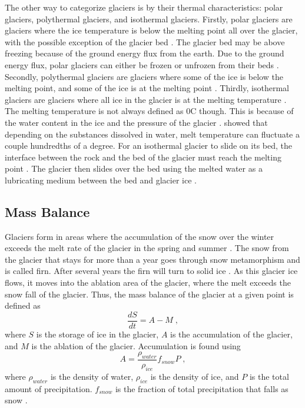 \documentclass{article}
\begin{document}
The other way to categorize glaciers is by their thermal characteristics: polar glaciers, polythermal glaciers, and isothermal glaciers. Firstly, polar glaciers are glaciers where the ice temperature is below the melting point all over the glacier, with the possible exception of the glacier bed \citep{Hooke2013}. The glacier bed may be above freezing because of the ground energy flux from the earth. Due to the ground energy flux, polar glaciers can either be frozen or unfrozen from their beds \citep{Hooke2013}. Secondly, polythermal glaciers are glaciers where some of the ice is below the melting point, and some of the ice is at the melting point \citep{Hooke2013}. Thirdly, isothermal glaciers are glaciers where all ice in the glacier is at the melting temperature \citep{Hooke2013}. The melting temperature is not always defined as 0C though. This is because of the water content in the ice and the pressure of the glacier \citep{Lliboutry1976}. \citet{Lliboutry1976} showed that depending on the substances dissolved in water, melt temperature can fluctuate a couple hundredths of a degree. For an isothermal glacier to slide on its bed, the interface between the rock and the bed of the glacier must reach the melting point \citep{Lliboutry1976}. The glacier then slides over the bed using the melted water as a lubricating medium between the bed and glacier ice \citep{Fowler1979}. 

\subsection{Mass Balance}
Glaciers form in areas where the accumulation of the snow over the winter exceeds the melt rate of the glacier in the spring and summer \citep{Hooke2013}. The snow from the glacier that stays for more than a year goes through snow metamorphism and is called firn. After several years the firn will turn to solid ice \citep{Hooke2013}. As this glacier ice flows, it moves into the ablation area of the glacier, where the melt exceeds the snow fall of the glacier. Thus, the mass balance of the glacier at a given point is defined as 
\begin{equation}
    \frac{dS}{dt} = A - M \; ,
\end{equation}
where $S$ is the storage of ice in the glacier, $A$ is the accumulation of the glacier, and $M$ is the ablation of the glacier. Accumulation is found using 
\begin{equation}\label{Accumulation}
A = \frac{\rho_{water}}{\rho_{ice}}f_{snow}P \; ,
\end{equation}
where $\rho_{water}$ is the density of water, $\rho_{ice}$ is the density of ice, and $P$ is the total amount of precipitation. $f_{snow}$ is the fraction of total precipitation that falls as snow \citep{Jarosch2013}.
\end{document}
